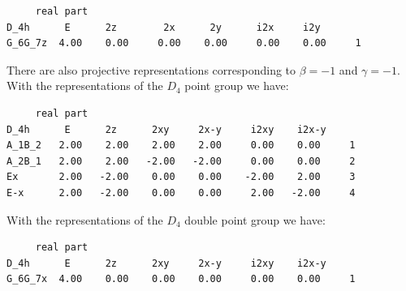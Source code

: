 \documentclass[12pt,a4paper]{article}
\begin{document}
\begin{verbatim}
     real part
D_4h      E      2z        2x      2y      i2x     i2y
G_6G_7z  4.00    0.00     0.00    0.00     0.00    0.00     1
\end{verbatim}
There are also projective representations corresponding to $\beta=-1$ 
and $\gamma=-1$. With the representations of the $D_4$ point group we have:
\begin{verbatim}
     real part
D_4h      E      2z      2xy     2x-y     i2xy    i2x-y
A_1B_2   2.00    2.00    2.00    2.00     0.00    0.00     1
A_2B_1   2.00    2.00   -2.00   -2.00     0.00    0.00     2
Ex       2.00   -2.00    0.00    0.00    -2.00    2.00     3
E-x      2.00   -2.00    0.00    0.00     2.00   -2.00     4
\end{verbatim}
With the representations of the $D_4$ double point group we have:  
\begin{verbatim}
     real part
D_4h      E      2z      2xy     2x-y     i2xy    i2x-y
G_6G_7x  4.00    0.00    0.00    0.00     0.00    0.00     1
\end{verbatim}

\newpage
\end{document}
